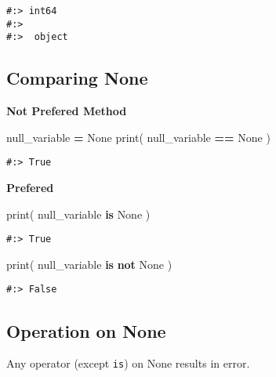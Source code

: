 \documentclass[
]{book}
\newenvironment{Shaded}{\begin{snugshade}}{\end{snugshade}}
\newcommand{\BuiltInTok}[1]{#1}
\newcommand{\KeywordTok}[1]{\textcolor[rgb]{0.27,0.27,0.27}{\textbf{#1}}}
\newcommand{\NormalTok}[1]{#1}
\newcommand{\OperatorTok}[1]{\textcolor[rgb]{0.43,0.43,0.43}{\textbf{#1}}}
\newcommand{\VariableTok}[1]{\textcolor[rgb]{0,0,0}{#1}}
\begin{document}
\begin{verbatim}
#:> int64 
#:> 
#:>  object
\end{verbatim}

\hypertarget{comparing-none}{%
\subsection{Comparing None}\label{comparing-none}}

\textbf{Not Prefered Method}

\begin{Shaded}
\begin{Highlighting}[]
\NormalTok{null\_variable }\OperatorTok{=} \VariableTok{None}
\BuiltInTok{print}\NormalTok{( null\_variable }\OperatorTok{==} \VariableTok{None}\NormalTok{ )}
\end{Highlighting}
\end{Shaded}

\begin{verbatim}
#:> True
\end{verbatim}

\textbf{Prefered}

\begin{Shaded}
\begin{Highlighting}[]
\BuiltInTok{print}\NormalTok{( null\_variable }\KeywordTok{is} \VariableTok{None}\NormalTok{ )}
\end{Highlighting}
\end{Shaded}

\begin{verbatim}
#:> True
\end{verbatim}

\begin{Shaded}
\begin{Highlighting}[]
\BuiltInTok{print}\NormalTok{( null\_variable }\KeywordTok{is} \KeywordTok{not} \VariableTok{None}\NormalTok{ )}
\end{Highlighting}
\end{Shaded}

\begin{verbatim}
#:> False
\end{verbatim}

\hypertarget{operation-on-none}{%
\subsection{Operation on None}\label{operation-on-none}}

Any operator (except \texttt{is}) on None results in error.
\end{document}
